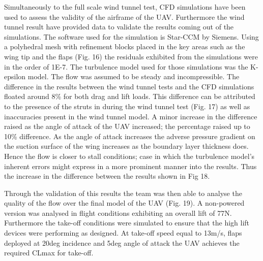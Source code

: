 \documentclass[../../main.tex]{subfiles}
\begin{document}
Simultaneously to the full scale wind tunnel test, CFD simulations have been used to assess the validity of the airframe of the UAV.
Furthermore the wind tunnel result have provided data to validate the results coming out of the simulations.
The software used for the simulation is Star-CCM by Siemens.
Using a polyhedral mesh with refinement blocks placed in the key areas such as the wing tip and the flaps (Fig. 16) the residuals exhibited from the simulations were in the order of 1E-7.
The turbulence model used for those simulations was the K-epsilon model.
The flow was assumed to be steady and incompressible.
The difference in the results between the wind tunnel tests and the CFD simulations floated around 8\% for both drag and lift loads.
This difference can be attributed to the presence of the struts in during the wind tunnel test (Fig. 17) as well as inaccuracies present in the wind tunnel model.
A minor increase in the difference raised as the angle of attack of the UAV increased; the percentage raised up to 10\% difference.
As the angle of attack increases the adverse pressure gradient on the suction surface of the wing increases as the boundary layer thickness does.
Hence the flow is closer to stall conditions; case in which the turbulence model’s inherent errors might express in a more prominent manner into the results.
Thus the increase in the difference between the results shown in Fig 18. 


Through the validation of this results the team was then able to analyse the quality of the flow over the final model of the UAV (Fig. 19).
A non-powered version was analysed in flight conditions exhibiting an overall lift of 77N.
Furthermore the take-off conditions were simulated to ensure that the high lift devices were performing as designed.
At take-off speed equal to 13m/s, flaps deployed at 20deg incidence and 5deg angle of attack the UAV achieves the required CLmax for take-off. 

\end{document}
